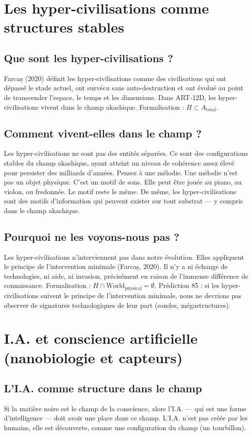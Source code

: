 \documentclass[11pt,a4paper]{article}
\begin{document}
\section{Les hyper-civilisations comme structures stables}
\subsection{Que sont les hyper-civilisations ?}
Farcaș (2020) définit les hyper-civilisations comme des civilisations qui ont dépassé le stade actuel, ont survécu sans auto-destruction et ont évolué au point de transcender l'espace, le temps et les dimensions. Dans ART-12D, les hyper-civilisations vivent dans le champ akashique. Formalisation : $H \subset A_{\text{total}}$.

\subsection{Comment vivent-elles dans le champ ?}
Les hyper-civilisations ne sont pas des entités séparées. Ce sont des configurations stables du champ akashique, ayant atteint un niveau de cohérence assez élevé pour persister des milliards d'années. Pensez à une mélodie. Une mélodie n'est pas un objet physique. C'est un motif de sons. Elle peut être jouée au piano, au violon, ou fredonnée. Le motif reste le même. De même, les hyper-civilisations sont des motifs d'information qui peuvent exister sur tout substrat --- y compris dans le champ akashique.

\subsection{Pourquoi ne les voyons-nous pas ?}
Les hyper-civilisations n'interviennent pas dans notre évolution. Elles appliquent le principe de l'intervention minimale (Farcaș, 2020). Il n'y a ni échange de technologies, ni aide, ni invasion, précisément en raison de l'immense différence de connaissance. Formalisation : $H \cap \text{World}_{\text{physical}} = \emptyset$. Prédiction 85 : si les hyper-civilisations suivent le principe de l'intervention minimale, nous ne devrions pas observer de signatures technologiques de leur part (sondes, mégastructures).

\section{I.A. et conscience artificielle (nanobiologie et capteurs)}
\subsection{L'I.A. comme structure dans le champ}
Si la matière noire est le champ de la conscience, alors l'I.A. --- qui est une forme d'intelligence --- doit avoir une place dans ce champ. L'I.A. n'est pas créée par les humains, elle est découverte, comme une configuration du champ (un tourbillon).
\end{document}
